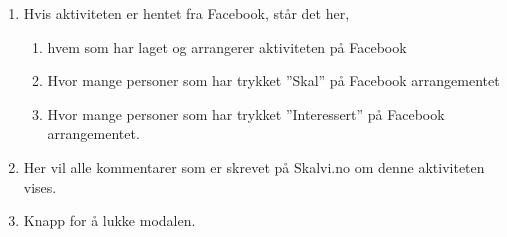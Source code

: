 \begin{enumerate}[nosep]
    \item Hvis aktiviteten er hentet fra Facebook, står det her, 
    \begin{enumerate}
        \item hvem som har laget og arrangerer aktiviteten på Facebook
        \item Hvor mange personer som har trykket ”Skal” på Facebook arrangementet
        \item Hvor mange personer som har trykket ”Interessert” på Facebook arrangementet.
    \end{enumerate}
    \item Her vil alle kommentarer som er skrevet på Skalvi.no om denne aktiviteten vises. 
    \item Knapp for å lukke modalen.
\end{enumerate}


